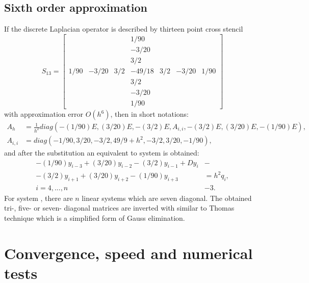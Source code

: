 \documentclass[11pt,a4paper,twoside]{article}
\begin{document}
\subsection{Sixth order approximation}

If the discrete Laplacian operator is described by thirteen point cross stencil
\[
S_{13} = 
\begin{bmatrix}
          &       &       &   1/90  & & &  \\
          &       &       &  -3/20  & & &  \\
          &       &       &   3/2     & &   & \\
1/90 & -3/20 &  3/2 & -49/18 & 3/2 & -3/20 & 1/90 \\
          &       &       &   3/2     & &   & \\
          &       &       &  -3/20  & & &  \\
          &       &       &   1/90  & & &
\end{bmatrix}
\]
with approximation error $O(h^6)$, then in short notations:
 \begin{align*} 
A_h &= \frac{1}{h^2}diag( -(1/90)E, (3/20)E, -(3/2)E, A_{i,i}, -(3/2)E, (3/20)E, -(1/90)E), \\
A_{i,i} & = diag(-1/90, 3/20, -3/2, 49/9 + h^2, -3/2, 3/20, -1/90),
\end{align*}
and after the substitution  an equivalent to  system is obtained:
\begin{align}
-(1/90)y_{i-3} + (3/20)y_{i-2} - (3/2)y_{i-1} + D y_i  &-\nonumber \\
  - (3/2)y_{i+1} + (3/20)y_{i+2} -  (1/90)y_{i+3} &= h^2 q_i,\nonumber \\
 i = 4,...,n  &-3. \label{SubSys7}
\end{align}
For system , there are $n$ linear systems which are seven diagonal.
\fi
The obtained tri-, five- or seven- diagonal matrices are inverted with similar to Thomas technique which is a simplified form of Gauss elimination.

\section{Convergence, speed and numerical tests}\label{NumTests}
\end{document}
